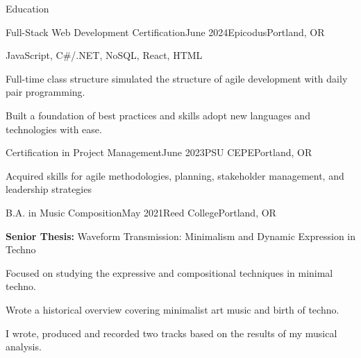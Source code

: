 \documentclass[
	11pt, %
]{resume} %
\begin{document}
\begin{rSection}{Education}
	
	\begin{rSubsection}{Full-Stack Web Development Certification}{June 2024}{Epicodus}{Portland, OR}
		\item JavaScript, C\#/.NET, NoSQL, React, HTML 
		\item Full-time class structure simulated the structure of agile development with daily pair programming.
		\item Built a foundation of best practices and skills adopt new languages and technologies with ease.
		\item 
	\end{rSubsection}
	\begin{rSubsection}{Certification in Project Management}{June 2023}{PSU CEPE}{Portland, OR}
		\item Acquired skills for agile methodologies, planning, stakeholder management, and leadership strategies
	\end{rSubsection}
	\begin{rSubsection}{B.A. in Music Composition}{May 2021}{Reed College}{Portland, OR}
		\item \textbf{Senior Thesis:} Waveform Transmission: Minimalism and Dynamic Expression in Techno
		\item Focused on studying the expressive and compositional techniques in minimal techno.
		\item Wrote a historical overview covering minimalist art music and birth of techno.
		\item I wrote, produced and recorded two tracks based on the results of my musical analysis.
	\end{rSubsection}

	
\end{rSection}
\end{document}
